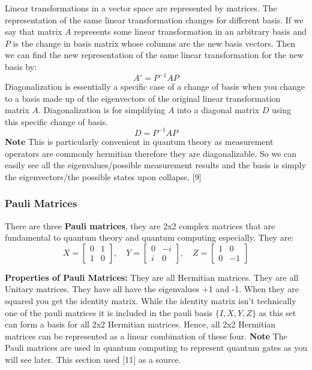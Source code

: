 Linear transformations in a vector space are represented by matrices. The representation of the same linear transformation changes for different basis. If we say that matrix \( A \) represents some linear transformation in an arbitrary basis and \( P \) is the change in basis matrix whose columns are the new basis vectors. Then we can find the new representation of the same linear transformation for the new basis by:
\begin{equation}
A' = P^{-1} A P
\end{equation}
Diagonalization is essentially a specific case of a change of basis when you change to a basis made up of the eigenvectors of the original linear transformation matrix \( A \). Diagonalization is for simplifying \( A \) into a diagonal matrix \( D \) using this specific change of basis.
\begin{equation}
D = P^{-1} A P
\end{equation}
\noindent \textbf{Note} This is particularly convenient in quantum theory as measurement operators are commonly hermitian therefore they are diagonalizable. So we can easily see all the eigenvalues/possible measurement results and the basis is simply the eigenvectors/the possible states upon collapse. [9]


\subsubsection{Pauli Matrices}
There are three \textbf{Pauli matrices}, they are 2x2 complex matrices that are fundamental to quantum theory and quantum computing especially. They are:
\[
X = \begin{bmatrix} 0 & 1 \\ 1 & 0 \end{bmatrix}, \quad
Y = \begin{bmatrix} 0 & -i \\ i & 0 \end{bmatrix}, \quad
Z = \begin{bmatrix} 1 & 0 \\ 0 & -1 \end{bmatrix}
\]

\noindent\textbf{Properties of Pauli Matrices:} They are all Hermitian matrices. They are all Unitary matrices. They have all have the eigenvalues +1 and -1. When they are squared you get the identity matrix. While the identity matrix isn't technically one of the pauli matrices it is included in the pauli basis \( \{ I, X, Y, Z \} \) as this set can form a basis for all 2x2 Hermitian matrices. Hence, all 2x2 Hermitian matrices can be represented as a linear combination of these four.
\noindent\textbf{Note} The Pauli matrices are used in quantum computing to represent quantum gates as you will see later. This section used [11] as a source.



